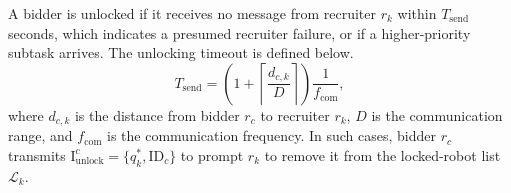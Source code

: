 \documentclass[lettersize,journal]{IEEEtran}
\begin{document}
A bidder is unlocked if it receives no message from recruiter $r_k$ within $T_{\mathrm{send}}$ seconds, which indicates a presumed recruiter failure, or if a higher-priority subtask arrives. The unlocking timeout is defined below.
\begin{equation}
T_{\mathrm{send}}
=
\left(1+\left\lceil \frac{d_{c,k}}{D} \right\rceil\right)\frac{1}{f_{\mathrm{com}}},
\end{equation}
where $d_{c,k}$ is the distance from bidder $r_c$ to recruiter $r_k$, $D$ is the communication range, and $f_{\mathrm{com}}$ is the communication frequency. In such cases, bidder $r_c$ transmits
$\mathrm{I}_{\mathrm{unlock}}^c = \{q_k^\ast,\mathrm{ID}_c\}$
to prompt $r_k$ to remove it from the locked-robot list $\mathcal{L}_k$.





\end{document}
